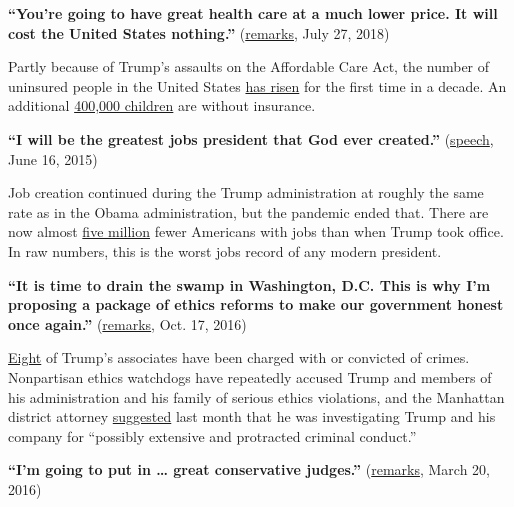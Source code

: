 \textbf{``You're going to have great health care at a much lower price.
It will cost the United States nothing.''}
(\href{https://www.whitehouse.gov/briefings-statements/remarks-president-trump-economy/}{remarks},
July 27, 2018)

Partly because of Trump's assaults on the Affordable Care Act, the
number of uninsured people in the United States
\href{https://khn.org/news/number-of-americans-without-insurance-rises-in-2018/\#:~:text=For\%20the\%20first\%20time\%20in,up\%20from\%207.9\%25\%20in\%202017.}{has
risen} for the first time in a decade. An additional
\href{https://www.nytimes3xbfgragh.onion/2019/10/22/upshot/medicaid-uninsured-children.html}{400,000
children} are without insurance.

\textbf{``I will be the greatest jobs president that God ever
created.''}
(\href{https://www.c-span.org/video/?326473-1/donald-trump-presidential-campaign-announcement}{speech},
June 16, 2015)

Job creation continued during the Trump administration at roughly the
same rate as in the Obama administration, but the pandemic ended that.
There are now almost
\href{https://www.bls.gov/charts/employment-situation/civilian-employment.htm}{five
million} fewer Americans with jobs than when Trump took office. In raw
numbers, this is the worst jobs record of any modern president.

\textbf{``It is time to drain the swamp in Washington, D.C. This is why
I'm proposing a package of ethics reforms to make our government honest
once again.''}
(\href{https://www.cnn.com/videos/politics/2016/10/17/donald-trump-ethics-reform-plan-green-bay-wi-sot.cnn}{remarks},
Oct. 17, 2016)

\href{https://www.reuters.com/article/us-usa-trump-bannon-associates-factbox/factbox-here-are-eight-trump-associates-arrested-or-convicted-of-crimes-idUSKBN25G1YU}{Eight}
of Trump's associates have been charged with or convicted of crimes.
Nonpartisan ethics watchdogs have repeatedly accused Trump and members
of his administration and his family of serious ethics violations, and
the Manhattan district attorney
\href{https://www.nytimes3xbfgragh.onion/2020/08/03/nyregion/donald-trump-taxes-cyrus-vance.html}{suggested}
last month that he was investigating Trump and his company for
``possibly extensive and protracted criminal conduct.''

\textbf{``I'm going to put in \ldots{} great conservative judges.''}
(\href{https://www.realclearpolitics.com/video/2016/03/21/trump_i_will_produce_a_list_of_5-10_judges_that_i_guarantee_i_will_nominate_to_supreme_court_if_elected.html}{remarks},
March 20, 2016)

